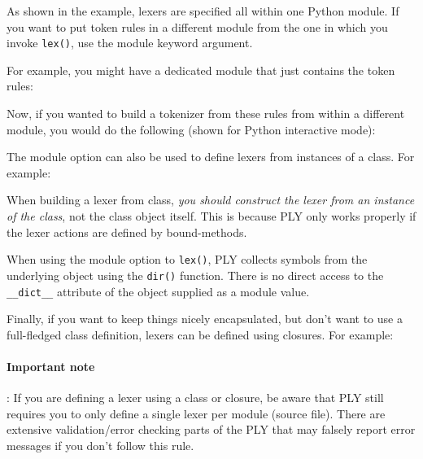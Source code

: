 
As shown in the example, lexers are specified all within one Python module. If
you want to put token rules in a different module from the one in which you
invoke \verb|lex()|, use the module keyword argument.

For example, you might have a dedicated module that just contains the token
rules:

Now, if you wanted to build a tokenizer from these rules from within a different
module, you would do the following (shown for Python interactive mode):


The module option can also be used to define lexers from instances of a class.
For example:

When building a lexer from class, \emph{you should construct the lexer from an
instance of the class}, not the class object itself. This is because PLY only
works properly if the lexer actions are defined by bound-methods.

When using the module option to \verb|lex()|, PLY collects symbols from the
underlying object using the \verb|dir()| function. There is no direct access to
the \verb|__dict__| attribute of the object supplied as a module value.


Finally, if you want to keep things nicely encapsulated, but don't want to use a
full-fledged class definition, lexers can be defined using closures. For
example:

\paragraph{Important note}: If you are defining a lexer using a class or
closure, be aware that PLY still requires you to only define a single lexer per
module (source file). There are extensive validation/error checking parts of the
PLY that may falsely report error messages if you don't follow this rule.

\secup
